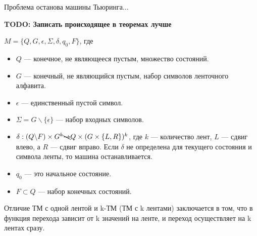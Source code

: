     
    \begin{Def}
        Проблема останова машины Тьюринга...
    \end{Def}

    
    
    \par \textbf{TODO: Записать происходящее в теоремах лучше}
    \begin{Def}
    $M = \{Q, G, \epsilon, \Sigma, \delta, q_0, F\}$, где
    \begin{itemize}
        \item $Q$ --- конечное, не являющееся пустым, множество состояний.
        \item $G$ --- конечный, не являющийся пустым, набор символов ленточного алфавита.
        \item $\epsilon$ --- единственный пустой символ.
        \item $\Sigma = G \backslash \{\epsilon\}$ --- набор входных символов.
        \item $\delta : (Q \backslash F) \times G^k \bcancel{\rightarrow}
        Q \times (G \times \{L, R\})^k$, где $k$ --- количество лент, $L$ --- сдвиг влево, а $R$ --- сдвиг вправо. Если $\delta$ не определена для текущего состояния и символа ленты, то машина останавливается.
        \item $q_0$ --- это начальное состояние.
        \item $F \subset {Q}$  --- набор конечных состояний.
    \end{itemize}
    \end{Def}
    \begin{Rem}
        Отличие ТМ с одной лентой и k-ТМ (ТМ с k лентами) заключается в том, что в функция перехода зависит от k значений на ленте, и переход осуществляет на k лентах сразу.
    \end{Rem}


